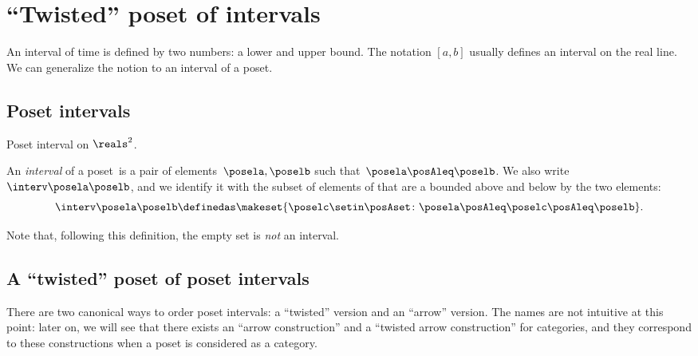
\section{``Twisted'' poset of intervals}

An interval of time is defined by two numbers: a lower and upper bound.
The notation $[a,b]$ usually defines an interval on the real line.
We can generalize the notion to an interval of a poset.

\subsection{Poset intervals}
\begin{marginfigure}
    \centering
    \caption{Poset interval on $\reals^2$.}
    \label{fig:int_posets}
\end{marginfigure}

\begin{definition}[Interval]
    \label{def:interval}
    An \emph{interval} of a poset~\posA is a pair of elements~$\posela, \poselb$ such that~$\posela \posAleq \poselb$.
    We also write $\interv \posela \poselb$, and we identify it with the subset of elements of \posA that are a bounded above and below by the two elements:
    \begin{equation}
        \interv \posela \poselb
        \definedas
        \makeset{
            \poselc \setin \posAset \colon
            \posela \posAleq \poselc \posAleq \poselb
        }.
    \end{equation}
\end{definition}

Note that, following this definition, the empty set is \emph{not} an interval.

\subsection{A ``twisted'' poset of poset intervals}

There are two canonical ways to order poset intervals: a ``twisted'' version and an ``arrow'' version.
The names are not intuitive at this point: later on, we will see that there exists an ``arrow construction'' and a ``twisted arrow construction'' for categories, and they correspond to these constructions when a poset is considered as a category.

